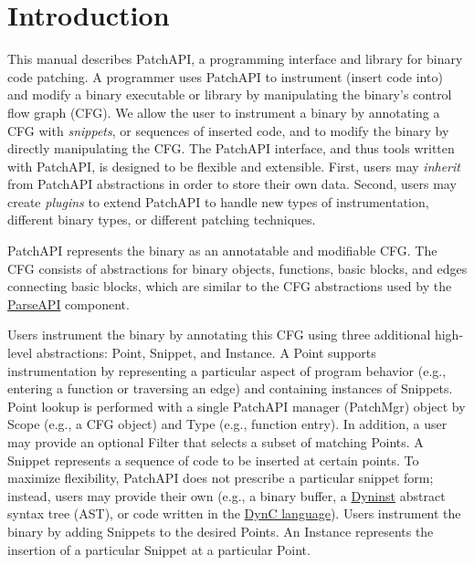 \section{Introduction}
\label{sec-intro}

This manual describes PatchAPI, a programming interface and library
for binary code patching. A programmer uses PatchAPI to instrument
(insert code into) and modify a binary executable or library by
manipulating the binary's control flow graph (CFG). We allow the user
to instrument a binary by annotating a CFG with \emph{snippets}, or
sequences of inserted code, and to modify the binary by directly
manipulating the CFG. The PatchAPI interface, and thus tools written
with PatchAPI, is designed to be flexible and extensible. First, users
may \emph{inherit} from PatchAPI abstractions in order to store their
own data. Second, users may create \emph{plugins} to extend PatchAPI
to handle new types of instrumentation, different binary types, or
different patching techniques. 

PatchAPI represents the binary as an annotatable and modifiable CFG. The CFG
consists of abstractions for binary objects, functions, basic blocks, and edges
connecting basic blocks, which are similar to the CFG abstractions used by the
\href{ftp://ftp.cs.wisc.edu/paradyn/releases/release7.0/doc/parseapi.pdf}{ParseAPI}
component.

Users instrument the binary by annotating this CFG using three additional
high-level abstractions: Point, Snippet, and Instance.  A Point supports
instrumentation by representing a particular aspect of program behavior (e.g.,
entering a function or traversing an edge) and containing instances of Snippets.
Point lookup is performed with a single PatchAPI manager (PatchMgr) object by
Scope (e.g., a CFG object) and Type (e.g., function entry). In addition, a user
may provide an optional Filter that selects a subset of matching Points.  A
Snippet represents a sequence of code to be inserted at certain points. To
maximize flexibility, PatchAPI does not prescribe a particular snippet form;
instead, users may provide their own (e.g., a binary buffer, a
\href{ftp://ftp.cs.wisc.edu/paradyn/releases/release7.0/doc/dyninstProgGuide.pdf}{Dyninst}
abstract syntax tree (AST), or code written in the
\href{ftp://ftp.cs.wisc.edu/paradyn/releases/release7.0/doc/dynC_API.pdf}{DynC
  language}). Users instrument the binary by adding Snippets to the desired
Points. An Instance represents the insertion of a particular Snippet at a
particular Point.


